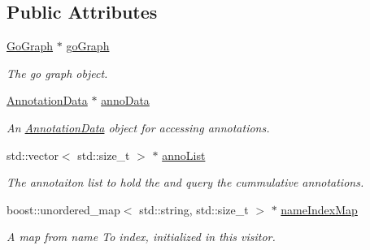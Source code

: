 \subsection*{Public Attributes}
\begin{DoxyCompactItemize}
\item 
\hyperlink{classGoGraph}{Go\+Graph} $\ast$ \hyperlink{classTermProbabilityMap_1_1dfs__cumulative__annotations__visitor_a9588ad34b2d743cb8245c91d27fe22e1}{go\+Graph}\hypertarget{classTermProbabilityMap_1_1dfs__cumulative__annotations__visitor_a9588ad34b2d743cb8245c91d27fe22e1}{}\label{classTermProbabilityMap_1_1dfs__cumulative__annotations__visitor_a9588ad34b2d743cb8245c91d27fe22e1}

\begin{DoxyCompactList}\small\item\em The go graph object. \end{DoxyCompactList}\item 
\hyperlink{classAnnotationData}{Annotation\+Data} $\ast$ \hyperlink{classTermProbabilityMap_1_1dfs__cumulative__annotations__visitor_a2200329f595bd75534fb37be72550d21}{anno\+Data}\hypertarget{classTermProbabilityMap_1_1dfs__cumulative__annotations__visitor_a2200329f595bd75534fb37be72550d21}{}\label{classTermProbabilityMap_1_1dfs__cumulative__annotations__visitor_a2200329f595bd75534fb37be72550d21}

\begin{DoxyCompactList}\small\item\em An \hyperlink{classAnnotationData}{Annotation\+Data} object for accessing annotations. \end{DoxyCompactList}\item 
std\+::vector$<$ std\+::size\+\_\+t $>$ $\ast$ \hyperlink{classTermProbabilityMap_1_1dfs__cumulative__annotations__visitor_aab2aba55afae7c48e8834d409a889193}{anno\+List}\hypertarget{classTermProbabilityMap_1_1dfs__cumulative__annotations__visitor_aab2aba55afae7c48e8834d409a889193}{}\label{classTermProbabilityMap_1_1dfs__cumulative__annotations__visitor_aab2aba55afae7c48e8834d409a889193}

\begin{DoxyCompactList}\small\item\em The annotaiton list to hold the and query the cummulative annotations. \end{DoxyCompactList}\item 
boost\+::unordered\+\_\+map$<$ std\+::string, std\+::size\+\_\+t $>$ $\ast$ \hyperlink{classTermProbabilityMap_1_1dfs__cumulative__annotations__visitor_af1db06d68d0e336e1300aabc2ba5ad9c}{name\+Index\+Map}\hypertarget{classTermProbabilityMap_1_1dfs__cumulative__annotations__visitor_af1db06d68d0e336e1300aabc2ba5ad9c}{}\label{classTermProbabilityMap_1_1dfs__cumulative__annotations__visitor_af1db06d68d0e336e1300aabc2ba5ad9c}

\begin{DoxyCompactList}\small\item\em A map from name To index, initialized in this visitor. \end{DoxyCompactList}\end{DoxyCompactItemize}


